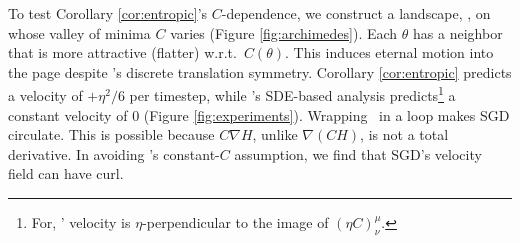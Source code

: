 To test Corollary \ref{cor:entropic}'s $C$-dependence,
we %
construct a landscape, \Helix, on
whose valley of %
minima $C$ varies (Figure
\ref{fig:archimedes}).  Each 
$\theta$ has a neighbor that is more attractive (flatter) w.r.t.\
$C(\theta)$.  This induces eternal motion into the page
despite \Helix's discrete translation symmetry.
Corollary \ref{cor:entropic} predicts a velocity of
$+\eta^2/6$ per timestep, while \cite{ch18}'s SDE-based analysis
predicts\footnote{
    For, \Helix' velocity is $\eta$-perpendicular to the image
    of $(\eta C)^\mu_\nu$.%
} a constant velocity of $0$ (Figure
\ref{fig:experiments}).
Wrapping \Helix\ in a loop makes SGD circulate. %
This is
possible because $C\nabla H$, unlike $\nabla(CH)$, is not a total
derivative. 
In avoiding \cite{we19b}'s constant-$C$ assumption, we 
find that SGD's velocity field can have curl. 

